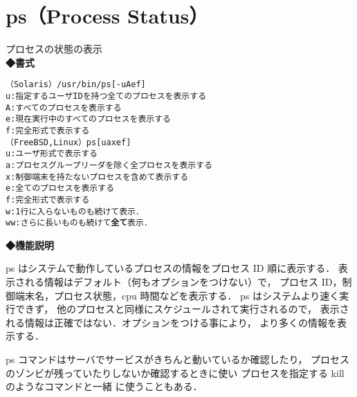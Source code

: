 
\section{ps（Process Status）}
プロセスの状態の表示\\
\label{cmd:ps}
\noindent
{\bf ◆書式}
\begin{center}
\begin{screen}
\begin{alltt}
（Solaris）/usr/bin/ps [-uAef]
  u : 指定するユーザ ID を持つ全てのプロセスを表示する
  A : すべてのプロセスを表示する
  e : 現在実行中のすべてのプロセスを表示する
  f : 完全形式で表示する
（FreeBSD, Linux）  ps [uaxef]
  u : ユーザ形式で表示する
  a : プロセスグループリーダを除く全プロセスを表示する
  x : 制御端末を持たないプロセスを含めて表示する
  e : 全てのプロセスを表示する
  f : 完全形式で表示する
  w : 1行に入らないものも続けて表示．
  ww: さらに長いものも続けて\textbf{全て}表示．
\end{alltt}
\end{screen}
\end{center}

\noindent
{\bf ◆機能説明}

ps はシステムで動作しているプロセスの情報をプロセス ID 順に表示する．
表示される情報はデフォルト（何もオプションをつけない）で，
プロセス ID，制御端末名，プロセス状態，cpu 時間などを表示する．
ps はシステムより速く実行できず，
他のプロセスと同様にスケジュールされて実行されるので，
表示される情報は正確ではない．オプションをつける事により，
より多くの情報を表示する．

ps コマンドはサーバでサービスがきちんと動いているか確認したり，
プロセスのゾンビが残っていたりしないか確認するときに使い プロセスを指定する kill のようなコマンドと一緒
に使うこともある．

